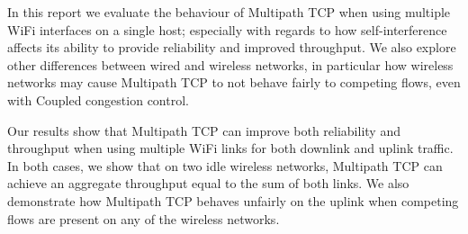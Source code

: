 In this report we evaluate the behaviour of Multipath TCP when using multiple
WiFi interfaces on a single host; especially with regards to how
self-interference affects its ability to provide reliability and improved
throughput. We also explore other differences between wired and wireless
networks, in particular how wireless networks may cause Multipath TCP to not
behave fairly to competing flows, even with Coupled congestion control.

Our results show that Multipath TCP can improve both reliability and throughput
when using multiple WiFi links for both downlink and uplink traffic. In both
cases, we show that on two idle wireless networks, Multipath TCP can achieve an
aggregate throughput equal to the sum of both links. We also demonstrate how
Multipath TCP behaves unfairly on the uplink when competing flows are present on
any of the wireless networks.
